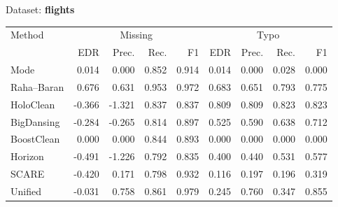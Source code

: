 \begin{subtable}[t]{0.492\linewidth}
\caption{Dataset: \textbf{flights}}
\label{tab:q1-acc-flights}
\centering
\begin{tabular}{lrrrrrrrr}
\toprule
\multirow{2}{*}{Method} &\multicolumn{4}{c}{Missing} &\multicolumn{4}{c}{Typo}\\
\cmidrule(lr){2-5}\cmidrule(l){6-9}
 & EDR & Prec. & Rec. & F1 & EDR & Prec. & Rec. & F1\\
\midrule
\midrule
Mode & 0.014 & 0.000 & 0.852 & 0.914 & 0.014 & 0.000 & 0.028 & 0.000 \\
Raha–Baran & 0.676 & 0.631 & 0.953 & 0.972 & 0.683 & 0.651 & 0.793 & 0.775 \\
HoloClean & -0.366 & -1.321 & 0.837 & 0.837 & 0.809 & 0.809 & 0.823 & 0.823 \\
BigDansing & -0.284 & -0.265 & 0.814 & 0.897 & 0.525 & 0.590 & 0.638 & 0.712 \\
BoostClean & 0.000 & 0.000 & 0.844 & 0.893 & 0.000 & 0.000 & 0.000 & 0.000 \\
Horizon & -0.491 & -1.226 & 0.792 & 0.835 & 0.400 & 0.440 & 0.531 & 0.577 \\
SCARE & -0.420 & 0.171 & 0.798 & 0.932 & 0.116 & 0.197 & 0.196 & 0.319 \\
Unified & -0.031 & 0.758 & 0.861 & 0.979 & 0.245 & 0.760 & 0.347 & 0.855 \\
\bottomrule
\bottomrule
\end{tabular}
\end{subtable}